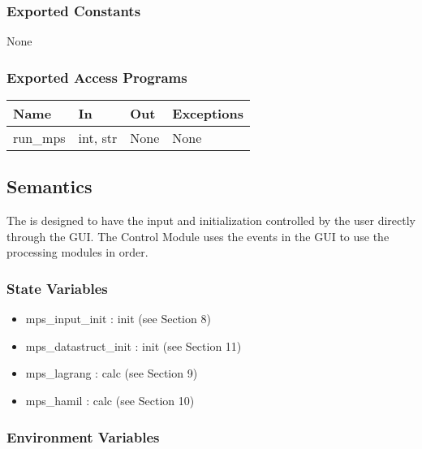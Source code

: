 \documentclass[12pt, titlepage]{article}
\begin{document}
\subsubsection{Exported Constants}

None

\subsubsection{Exported Access Programs}

\begin{center}
\begin{tabular}{p{2cm} p{4cm} p{4cm} p{2cm}}
\hline
\textbf{Name} & \textbf{In} & \textbf{Out} & \textbf{Exceptions} \\
\hline
run\_mps & int, str & None & None \\
\hline
\end{tabular}
\end{center}

\subsection{Semantics}

The \progname is designed to have the input and initialization controlled by 
the user directly through the GUI.
The \progname Control Module uses the events in the \progname GUI to use the 
processing modules in order.

\subsubsection{State Variables}

\begin{itemize}
	\item mps\_input\_init : init (see Section 8)
	\item mps\_datastruct\_init : init (see Section 11)
	\item mps\_lagrang : calc (see Section 9)
	\item mps\_hamil : calc (see Section 10)
\end{itemize}


\subsubsection{Environment Variables}
\end{document}
